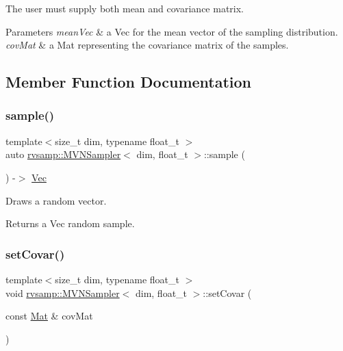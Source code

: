 The user must supply both mean and covariance matrix. 


\begin{DoxyParams}{Parameters}
{\em mean\+Vec} & a Vec for the mean vector of the sampling distribution. \\
\hline
{\em cov\+Mat} & a Mat representing the covariance matrix of the samples. \\
\hline
\end{DoxyParams}


\subsection{Member Function Documentation}
\mbox{\label{classrvsamp_1_1MVNSampler_a1b0b148b0d1223e35e317c804c9bf127}} 
\subsubsection{\texorpdfstring{sample()}{sample()}}
{\footnotesize\ttfamily template$<$size\+\_\+t dim, typename float\+\_\+t $>$ \\
auto \hyperlink{classrvsamp_1_1MVNSampler}{rvsamp\+::\+M\+V\+N\+Sampler}$<$ dim, float\+\_\+t $>$\+::sample (\begin{DoxyParamCaption}{ }\end{DoxyParamCaption}) -\/$>$ \hyperlink{classrvsamp_1_1MVNSampler_a1110bc1695c5c959914602dbaf2f6878}{Vec}}



Draws a random vector. 

\begin{DoxyReturn}{Returns}
a Vec random sample. 
\end{DoxyReturn}
\mbox{\label{classrvsamp_1_1MVNSampler_a9b50fc87640fe9c25595076539cf1c1d}} 
\subsubsection{\texorpdfstring{set\+Covar()}{setCovar()}}
{\footnotesize\ttfamily template$<$size\+\_\+t dim, typename float\+\_\+t $>$ \\
void \hyperlink{classrvsamp_1_1MVNSampler}{rvsamp\+::\+M\+V\+N\+Sampler}$<$ dim, float\+\_\+t $>$\+::set\+Covar (\begin{DoxyParamCaption}\item[{const \hyperlink{classrvsamp_1_1MVNSampler_ad6891a72b508fd59263c6d62b6bffd14}{Mat} \&}]{cov\+Mat }\end{DoxyParamCaption})}



